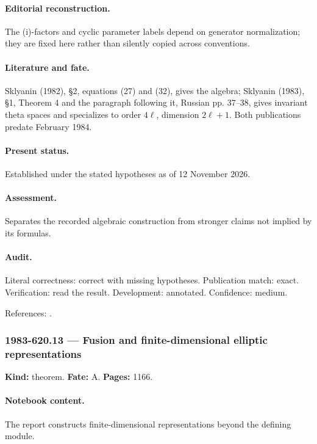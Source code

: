 \paragraph{Editorial reconstruction.} The (i)-factors and cyclic parameter labels depend on generator normalization; they are fixed here rather than silently copied across conventions.

\paragraph{Literature and fate.} Sklyanin (1982), \S2, equations (27) and (32), gives the algebra; Sklyanin (1983), \S1, Theorem 4 and the paragraph following it, Russian pp. 37–38, gives invariant theta spaces and specializes to order \(4\ell\), dimension \(2\ell+1\). Both publications predate February 1984.

\paragraph{Present status.} Established under the stated hypotheses as of 12 November 2026.

\paragraph{Assessment.} Separates the recorded algebraic construction from stronger claims not implied by its formulas.

\paragraph{Audit.} Literal correctness: correct with missing hypotheses. Publication match: exact. Verification: read the result. Development: annotated. Confidence: medium.

\noindent References: \citep{sklyanin1982algebraic,sklyanin1983representations}.\par

\subsubsection{1983-620.13 --- Fusion and finite-dimensional elliptic representations}

\label{item:1983-620.13}

\noindent\textbf{Kind:} theorem. \textbf{Fate:} A. \textbf{Pages:} 1166.\par

\paragraph{Notebook content.} The report constructs finite-dimensional representations beyond the defining module.

